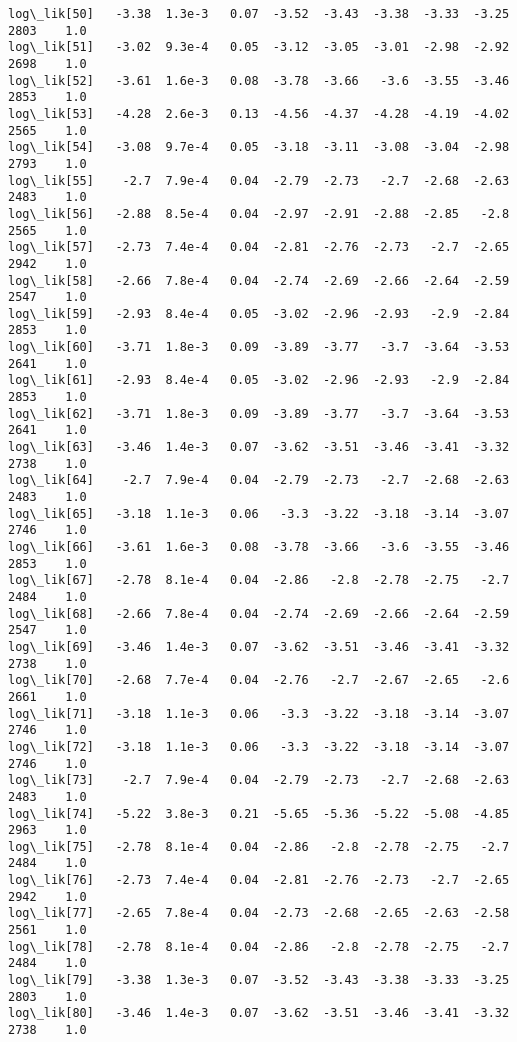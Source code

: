 \documentclass[11pt]{article}
\begin{document}
\begin{Verbatim}[commandchars=\\\{\}]
log\_lik[50]   -3.38  1.3e-3   0.07  -3.52  -3.43  -3.38  -3.33  -3.25   2803    1.0
log\_lik[51]   -3.02  9.3e-4   0.05  -3.12  -3.05  -3.01  -2.98  -2.92   2698    1.0
log\_lik[52]   -3.61  1.6e-3   0.08  -3.78  -3.66   -3.6  -3.55  -3.46   2853    1.0
log\_lik[53]   -4.28  2.6e-3   0.13  -4.56  -4.37  -4.28  -4.19  -4.02   2565    1.0
log\_lik[54]   -3.08  9.7e-4   0.05  -3.18  -3.11  -3.08  -3.04  -2.98   2793    1.0
log\_lik[55]    -2.7  7.9e-4   0.04  -2.79  -2.73   -2.7  -2.68  -2.63   2483    1.0
log\_lik[56]   -2.88  8.5e-4   0.04  -2.97  -2.91  -2.88  -2.85   -2.8   2565    1.0
log\_lik[57]   -2.73  7.4e-4   0.04  -2.81  -2.76  -2.73   -2.7  -2.65   2942    1.0
log\_lik[58]   -2.66  7.8e-4   0.04  -2.74  -2.69  -2.66  -2.64  -2.59   2547    1.0
log\_lik[59]   -2.93  8.4e-4   0.05  -3.02  -2.96  -2.93   -2.9  -2.84   2853    1.0
log\_lik[60]   -3.71  1.8e-3   0.09  -3.89  -3.77   -3.7  -3.64  -3.53   2641    1.0
log\_lik[61]   -2.93  8.4e-4   0.05  -3.02  -2.96  -2.93   -2.9  -2.84   2853    1.0
log\_lik[62]   -3.71  1.8e-3   0.09  -3.89  -3.77   -3.7  -3.64  -3.53   2641    1.0
log\_lik[63]   -3.46  1.4e-3   0.07  -3.62  -3.51  -3.46  -3.41  -3.32   2738    1.0
log\_lik[64]    -2.7  7.9e-4   0.04  -2.79  -2.73   -2.7  -2.68  -2.63   2483    1.0
log\_lik[65]   -3.18  1.1e-3   0.06   -3.3  -3.22  -3.18  -3.14  -3.07   2746    1.0
log\_lik[66]   -3.61  1.6e-3   0.08  -3.78  -3.66   -3.6  -3.55  -3.46   2853    1.0
log\_lik[67]   -2.78  8.1e-4   0.04  -2.86   -2.8  -2.78  -2.75   -2.7   2484    1.0
log\_lik[68]   -2.66  7.8e-4   0.04  -2.74  -2.69  -2.66  -2.64  -2.59   2547    1.0
log\_lik[69]   -3.46  1.4e-3   0.07  -3.62  -3.51  -3.46  -3.41  -3.32   2738    1.0
log\_lik[70]   -2.68  7.7e-4   0.04  -2.76   -2.7  -2.67  -2.65   -2.6   2661    1.0
log\_lik[71]   -3.18  1.1e-3   0.06   -3.3  -3.22  -3.18  -3.14  -3.07   2746    1.0
log\_lik[72]   -3.18  1.1e-3   0.06   -3.3  -3.22  -3.18  -3.14  -3.07   2746    1.0
log\_lik[73]    -2.7  7.9e-4   0.04  -2.79  -2.73   -2.7  -2.68  -2.63   2483    1.0
log\_lik[74]   -5.22  3.8e-3   0.21  -5.65  -5.36  -5.22  -5.08  -4.85   2963    1.0
log\_lik[75]   -2.78  8.1e-4   0.04  -2.86   -2.8  -2.78  -2.75   -2.7   2484    1.0
log\_lik[76]   -2.73  7.4e-4   0.04  -2.81  -2.76  -2.73   -2.7  -2.65   2942    1.0
log\_lik[77]   -2.65  7.8e-4   0.04  -2.73  -2.68  -2.65  -2.63  -2.58   2561    1.0
log\_lik[78]   -2.78  8.1e-4   0.04  -2.86   -2.8  -2.78  -2.75   -2.7   2484    1.0
log\_lik[79]   -3.38  1.3e-3   0.07  -3.52  -3.43  -3.38  -3.33  -3.25   2803    1.0
log\_lik[80]   -3.46  1.4e-3   0.07  -3.62  -3.51  -3.46  -3.41  -3.32   2738    1.0

\end{Verbatim}
\end{document}
